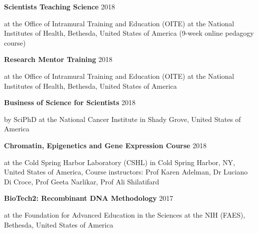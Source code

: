\documentclass[margin,line]{res}
\begin{document}
\begin{resume}
\vspace*{-2mm}

{\bf Scientists Teaching Science} \hfill {2018}\\
\vspace*{-3.5mm}
\begin{addmargin}[0pt]{.1\linewidth}
\vspace*{-1mm}
at the Office of Intramural Training and Education (OITE) at the National Institutes of Health, Bethesda, United States of America (9-week online pedagogy course)
\end{addmargin}

\vspace*{-2mm}

{\bf Research Mentor Training} \hfill {2018}\\
\vspace*{-3.5mm}
\begin{addmargin}[0pt]{.1\linewidth}
\vspace*{-1mm}
at the Office of Intramural Training and Education (OITE) at the National Institutes of Health, Bethesda, United States of America 
\end{addmargin}

\vspace*{-2mm}

{\bf Business of Science for Scientists} \hfill {2018}\\
\vspace*{-3.5mm}
\begin{addmargin}[0pt]{.1\linewidth}
\vspace*{-1mm}
by SciPhD at the National Cancer Institute in Shady Grove, United States of America
\end{addmargin}

\vspace*{-2mm}

{\bf Chromatin, Epigenetics and Gene Expression Course} \hfill {2018}\\
\vspace*{-3.5mm}
\begin{addmargin}[0pt]{.1\linewidth}
\vspace*{-1mm}
at the Cold Spring Harbor Laboratory (CSHL) in Cold Spring Harbor, NY, United States of America, Course instructors: Prof Karen Adelman, Dr Luciano Di Croce, Prof Geeta Narlikar, Prof Ali Shilatifard
\end{addmargin}

\vspace*{-2mm}

{\bf BioTech2: Recombinant DNA Methodology} \hfill {2017}\\
\vspace*{-3.5mm}
\begin{addmargin}[0pt]{.1\linewidth}
\vspace*{-1mm}
at the Foundation for Advanced Education in the Sciences at the NIH (FAES), Bethesda, United States of America
\end{addmargin}


\end{resume}
\end{document}
